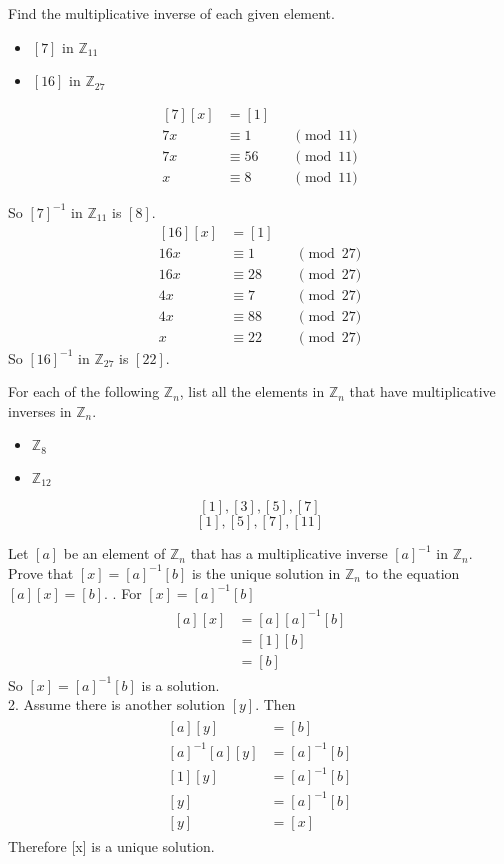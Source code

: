 \documentclass[paper=a4, fontsize=11pt]{jhwhw} %
\begin{document}
Find the multiplicative inverse of each given element.
\begin{itemize}
\item $[7]$ in $\mathbb{Z}_{11}$
\item $[16]$ in $\mathbb{Z}_{27}$
\end{itemize}
\solution
{}
\begin{equation}
\begin{alignedat}{2}
[7][x] &= [1]\\
7x&\equiv 1 & &\pmod{11}\\
7x&\equiv 56 & &\pmod{11}\\
x&\equiv 8 & &\pmod{11}
\end{alignedat}
\end{equation}

So $[7]^{-1}$ in $\mathbb{Z}_{11}$ is $[8]$.
\begin{equation}
\begin{alignedat}{2}
[16][x] &= [1]\\
16x&\equiv 1 & &\pmod{27}\\
16x&\equiv 28 & &\pmod{27}\\
4x&\equiv 7 & &\pmod{27}\\
4x&\equiv 88 & &\pmod{27}\\
x&\equiv 22 & &\pmod{27}
\end{alignedat}
\end{equation}
So $[16]^{-1}$ in $\mathbb{Z}_{27}$ is $[22]$.

For each of the following $\mathbb{Z}_n$, list all the elements in $\mathbb{Z}_n$ that have multiplicative inverses in $\mathbb{Z}_n$.
\begin{itemize}
\item $\mathbb{Z}_8$
\item $\mathbb{Z}_{12}$
\end{itemize}
$$[1], [3], [5], [7]$$
$$[1], [5], [7], [11]$$

Let $[a]$ be an element of $\mathbb{Z}_n$ that has a multiplicative inverse $[a]^{-1}$ in $\mathbb{Z}_n$. Prove that $[x]=[a]^{-1}[b]$ is the unique solution in $\mathbb{Z}_n$ to the equation $[a][x] = [b]$.
. For $[x]=[a]^{-1}[b]$
\begin{align}
\begin{split}
[a][x]&=[a][a]^{-1}[b]\\
&=[1][b]\\
&=[b]
\end{split}
\end{align}
So $[x]=[a]^{-1}[b]$ is a solution.\\
2. Assume there is another solution $[y]$. Then
\begin{align}
\begin{split}
[a][y] &= [b]\\
[a]^{-1}[a][y] &= [a]^{-1}[b]\\
[1][y]&=[a]^{-1}[b]\\
[y]&=[a]^{-1}[b]\\
[y]&=[x]
\end{split}
\end{align}
Therefore [x] is a unique solution.
\end{document}
